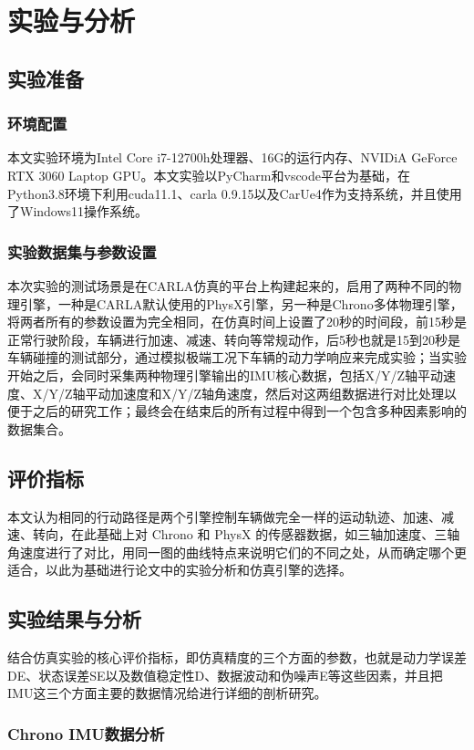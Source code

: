 \chapter{实验与分析}

\section{实验准备}

\subsection{环境配置}
本文实验环境为Intel Core i7-12700h处理器、16G的运行内存、NVIDiA GeForce RTX 3060 Laptop GPU。本文实验以PyCharm和vscode平台为基础，在Python3.8环境下利用cuda11.1、carla 0.9.15以及CarUe4作为支持系统，并且使用了Windows11操作系统。
\subsection{实验数据集与参数设置}

本次实验的测试场景是在CARLA仿真的平台上构建起来的，启用了两种不同的物理引擎，一种是CARLA默认使用的PhysX引擎，另一种是Chrono多体物理引擎，将两者所有的参数设置为完全相同，在仿真时间上设置了20秒的时间段，前15秒是正常行驶阶段，车辆进行加速、减速、转向等常规动作，后5秒也就是15到20秒是车辆碰撞的测试部分，通过模拟极端工况下车辆的动力学响应来完成实验；当实验开始之后，会同时采集两种物理引擎输出的IMU核心数据，包括X/Y/Z轴平动速度、X/Y/Z轴平动加速度和X/Y/Z轴角速度，然后对这两组数据进行对比处理以便于之后的研究工作；最终会在结束后的所有过程中得到一个包含多种因素影响的数据集合。
\section{评价指标}

本文认为相同的行动路径是两个引擎控制车辆做完全一样的运动轨迹、加速、减速、转向，在此基础上对 Chrono 和 PhysX 的传感器数据，如三轴加速度、三轴角速度进行了对比，用同一图的曲线特点来说明它们的不同之处，从而确定哪个更适合，以此为基础进行论文中的实验分析和仿真引擎的选择。
\section{实验结果与分析}
结合仿真实验的核心评价指标，即仿真精度的三个方面的参数，也就是动力学误差DE、状态误差SE以及数值稳定性D、数据波动和伪噪声E等这些因素，并且把IMU这三个方面主要的数据情况给进行详细的剖析研究。
\subsection{Chrono IMU数据分析}

